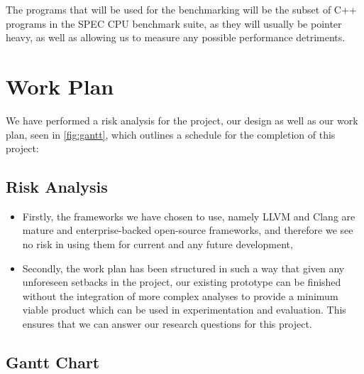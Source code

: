 \documentclass{proposal}
\begin{document}
    The programs that will be used for the benchmarking will be the subset of C++ programs in the SPEC CPU benchmark suite, as they will usually be pointer heavy, as well as allowing us to measure any possible performance detriments.




    \section{Work Plan}\label{sec:work-plan}

    We have performed a risk analysis for the project, our design as well as our work plan, seen in \autoref{fig:gantt}, which outlines a schedule for the completion of this project:

    \subsection{Risk Analysis}\label{subsec:risk-analysis}

    \begin{itemize}
        \item Firstly, the frameworks we have chosen to use, namely LLVM and Clang are mature and enterprise-backed open-source frameworks, and therefore we see no risk in using them for current and any future development,
        \item Secondly, the work plan has been structured in such a way that given any unforeseen setbacks in the project, our existing prototype can be finished without the integration of more complex analyses to provide a minimum viable product which can be used in experimentation and evaluation.
        This ensures that we can answer our research questions for this project.
    \end{itemize}

    \newpage

    \subsection{Gantt Chart}\label{subsec:gantt-chart}
\end{document}
